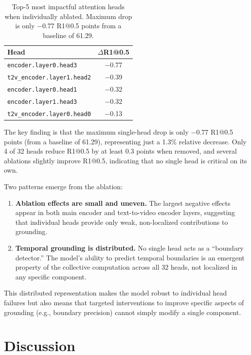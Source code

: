 \documentclass[10pt,twocolumn]{article}
\begin{document}
\begin{table}[t]
\centering
\caption{Top-5 most impactful attention heads when individually ablated. Maximum drop is only $-$0.77 R1@0.5 points from a baseline of 61.29.}
\label{tab:heads}
\small
\begin{tabular}{@{}lc@{}}
\toprule
\textbf{Head} & \textbf{$\Delta$R1@0.5} \\
\midrule
\texttt{encoder.layer0.head3} & $-$0.77 \\
\texttt{t2v\_encoder.layer1.head2} & $-$0.39 \\
\texttt{encoder.layer0.head1} & $-$0.32 \\
\texttt{encoder.layer1.head3} & $-$0.32 \\
\texttt{t2v\_encoder.layer0.head0} & $-$0.13 \\
\bottomrule
\end{tabular}
\vspace{-6pt}
\end{table}

The key finding is that the maximum single-head drop is only $-$0.77 R1@0.5 points (from a baseline of 61.29), representing just a 1.3\% relative decrease. Only 4 of 32 heads reduce R1@0.5 by at least 0.3 points when removed, and several ablations slightly improve R1@0.5, indicating that no single head is critical on its own.

Two patterns emerge from the ablation:
\begin{enumerate}[nosep,leftmargin=*]
  \item \textbf{Ablation effects are small and uneven.} The largest negative effects appear in both main encoder and text-to-video encoder layers, suggesting that individual heads provide only weak, non-localized contributions to grounding.
  \item \textbf{Temporal grounding is distributed.} No single head acts as a ``boundary detector.'' The model's ability to predict temporal boundaries is an emergent property of the collective computation across all 32 heads, not localized in any specific component.
\end{enumerate}

This distributed representation makes the model robust to individual head failures but also means that targeted interventions to improve specific aspects of grounding (e.g., boundary precision) cannot simply modify a single component.

\section{Discussion}
\label{sec:discussion}
\end{document}
